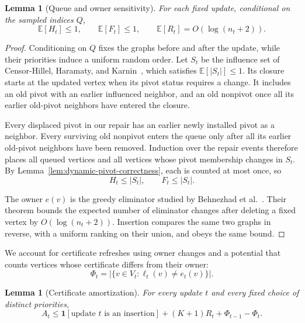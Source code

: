 \documentclass[11pt]{article}
\newtheorem{lemma}[theorem]{Lemma}
\theoremstyle{definition}
\theoremstyle{remark}
\newcommand{\1}{\mathbf{1}}
\begin{document}
\begin{lemma}[Queue and owner sensitivity]
\label{lem:dynamic-sensitivity}
For each fixed update, conditional on the sampled indices $Q$,
\[
    \mathbb E[H_t]\leq1,
    \qquad
    \mathbb E[F_t]\leq1,
    \qquad
    \mathbb E[R_t]=O(\log(n_t+2)).
\]
\end{lemma}

\begin{proof}
Conditioning on $Q$ fixes the graphs before and after the update, while their priorities induce a uniform random order.
Let $S_t$ be the influence set of Censor-Hillel, Haramaty, and Karnin~\cite[Theorem~1]{censor-hillel-2016}, which satisfies $\mathbb E[|S_t|]\leq1$. Its closure starts at the updated vertex when its pivot status requires a change. It includes an old pivot with an earlier influenced neighbor, and an old nonpivot once all its earlier old-pivot neighbors have entered the closure.

Every displaced pivot in our repair has an earlier newly installed pivot as a neighbor. Every surviving old nonpivot enters the queue only after all its earlier old-pivot neighbors have been removed. Induction over the repair events therefore places all queued vertices and all vertices whose pivot membership changes in $S_t$. By Lemma~\ref{lem:dynamic-pivot-correctness}, each is counted at most once, so
\[
    H_t\leq|S_t|,
    \qquad F_t\leq|S_t|.
\]

The owner $e(v)$ is the greedy eliminator studied by Behnezhad et al.~\cite[Theorem~3]{behnezhad-2019}. Their theorem bounds the expected number of eliminator changes after deleting a fixed vertex by $O(\log(n_t+2))$. Insertion compares the same two graphs in reverse, with a uniform ranking on their union, and obeys the same bound.
\end{proof}
We account for certificate refreshes using owner changes and a potential that counts vertices whose certificate differs from their owner:
\[
    \Phi_t=\bigl|\{v\in V_t:\ell_t(v)\neq e_t(v)\}\bigr|.
\]

\begin{lemma}[Certificate amortization]
\label{lem:certificate-amortization}
For every update $t$ and every fixed choice of distinct priorities,
\begin{equation}
    A_t\leq
    \mathbf{1}[\text{update }t\text{ is an insertion}]
    +(K+1)R_t+\Phi_{t-1}-\Phi_t.
    \label{eq:certificate-amortization}
\end{equation}
\end{lemma}
\end{document}
